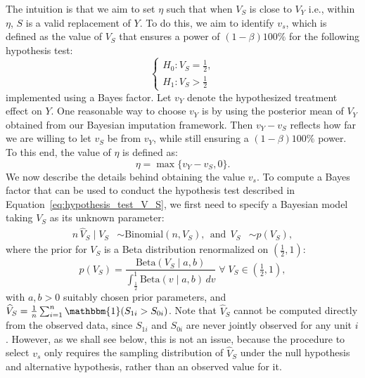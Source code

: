 \documentclass[12pt]{article}
\newcommand{\one}{\mathbbm{1}}
\begin{document}
The intuition is that we aim to set \(\eta\) such that when $V_S$ is close to $V_{Y}$ i.e., within \(\eta\), $S$ is a valid replacement of $Y$. To do this, we aim to identify $v_s$, which is defined as the value of \(V_{S}\) that ensures a power of \((1 - \beta)100\%\) for the following hypothesis test:
\begin{equation}
    \label{eq:hypothesis_test_V_S}
    \begin{cases}
        H_{0}: V_{S} = \tfrac{1}{2}, \\
        H_{1}: V_{S} > \tfrac{1}{2}
    \end{cases}
\end{equation}
implemented using a Bayes factor. Let $v_Y$ denote the hypothesized treatment effect on $Y$. One reasonable way to choose $v_Y$ is by using the posterior mean of $V_Y$ obtained from our Bayesian imputation framework. Then $v_{Y} - v_{S}$ reflects how far we are willing to let $v_{S}$ be from $v_{Y}$, while still ensuring a \((1 - \beta)100\%\) power. To this end, the value of \(\eta\) is defined as:
\begin{equation}
    \eta = \max \{ v_{Y} - v_{S}, 0 \}.
\end{equation}
We now describe the details behind obtaining the value $v_s$. To compute a Bayes factor that can be used to conduct the hypothesis test described in Equation~\eqref{eq:hypothesis_test_V_S}, we first need to specify a Bayesian model taking \(V_{S}\) as its unknown parameter:
\begin{equation}
    \begin{aligned}
        n \, \widehat{V}_{S} \mid V_{S} & \sim \text{Binomial}(n, V_{S}), ~~\mbox{and}~~ V_{S} & \sim p(V_{S}),
    \end{aligned}
\end{equation}
\vspace{-1mm} %
where the prior for \(V_{S}\) is a Beta distribution renormalized on \( \left( \frac{1}{2}, 1 \right)\):
\begin{equation}
    p(V_{S}) = \frac{\text{Beta}(V_{S} \mid a, b)}{\int_{\frac{1}{2}}^{1} \text{Beta}(v \mid a, b) \, dv} \; \forall \; V_{S} \in \left(\tfrac{1}{2}, 1\right),
\end{equation}
with \(a, b > 0\) suitably chosen prior parameters, and \(\widehat{V}_{S} = \frac{1}{n} \sum_{i=1}^{n} \one(S_{1i} > S_{0i})\). Note that \(\widehat{V}_{S}\) cannot be computed directly from the observed data, since \(S_{1i}\) and \(S_{0i}\) are never jointly observed for any unit \(i\). However, as we shall see below, this is not an issue, because the procedure to select \(v_{s}\) only requires the sampling distribution of \(\widehat{V}_{S}\) under the null hypothesis and alternative hypothesis, rather than an observed value for it.
\end{document}
